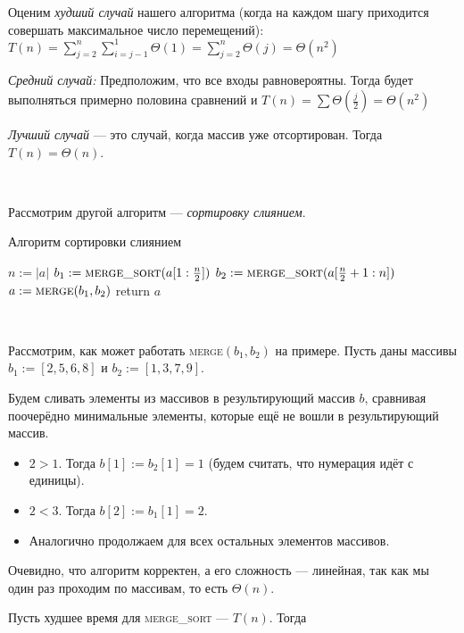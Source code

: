 Оценим \emph{худший случай} нашего алгоритма (когда на каждом шагу приходится совершать максимальное число перемещений): $T(n) = \sum\limits_{j=2}^n\sum\limits_{i=j-1}^1\Theta(1) = \sum\limits_{j=2}^n\Theta(j) = \Theta(n^2)$

\emph{Средний случай:} Предположим, что все входы равновероятны. Тогда будет выполняться примерно половина сравнений и $T(n) = \sum\limits\Theta(\frac{j}{2}) = \Theta(n^2)$

\emph{Лучший случай} --- это случай, когда массив уже отсортирован. Тогда $T(n) = \Theta(n)$.

\

Рассмотрим другой алгоритм --- \emph{сортировку слиянием}.

\begin{algorithm}
\caption{Алгоритм сортировки слиянием}
\begin{algorithmic}[1]
\State $n \mathrel{:=} |a|$
    \State $b_1 \mathrel{:=} \textsc{merge\_sort}(a[1:\frac{n}{2}])$
    \State $b_2 \mathrel{:=} \textsc{merge\_sort}(a[\frac{n}{2}+1:n])$
    \State $a \mathrel{:=} \textsc{merge}(b_1, b_2)$ 
\EndIf
\State return $a$
\EndFunction
\end{algorithmic}
\end{algorithm}

\

Рассмотрим, как может работать \textsc{merge}$(b_1, b_2)$ на примере. Пусть даны массивы $b_1 \mathrel{:=} [2,5,6,8]$ и $b_2 \mathrel{:=} [1,3,7,9]$.

Будем сливать элементы из массивов в результирующий массив $b$, сравнивая поочерёдно минимальные элементы, которые ещё не вошли в результирующий массив. 

\begin{itemize}
    \item $2 > 1$. Тогда $b[1] \mathrel{:=} b_2[1] = 1$ (будем считать, что нумерация идёт с единицы).
    \item $2 < 3$. Тогда $b[2] \mathrel{:=} b_1[1] = 2$.
    \item Аналогично продолжаем для всех остальных элементов массивов.
\end{itemize}
Очевидно, что алгоритм корректен, а его сложность --- линейная, так как мы один раз проходим по массивам, то есть $\Theta(n)$.

Пусть худшее время для \textsc{merge\_sort} --- $T(n)$. Тогда

